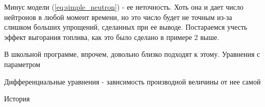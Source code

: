 Минус модели (\ref{eq:simple_neutron}) - ее неточность.
Хоть она и дает число нейтронов в любой момент времени, но это число будет не точным из-за слишком больших упрощений, сделанных при ее выводе.
Постараемся учесть эффект выгорания топлива, как это было сделано в примере 2 выше.




В школьной программе, впрочем, довольно близко подходят к этому.
Уравнения с параметром

Дифференциальные уравнения - зависимость производной величины от нее самой

История
 
